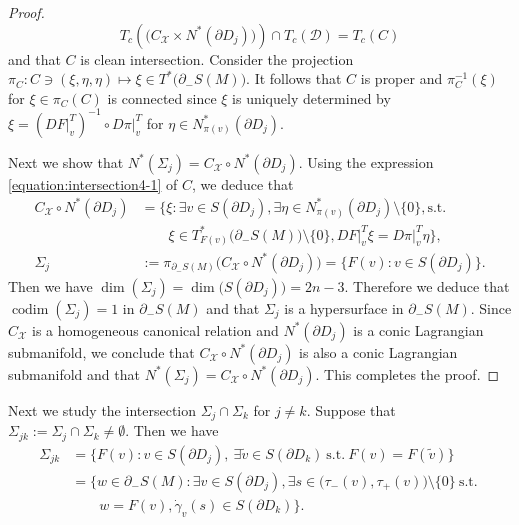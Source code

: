 \documentclass[a4paper,11pt,reqno]{amsart}
\numberwithin{equation}{section}
\theoremstyle{definition}
\theoremstyle{remark}
\begin{document}
\begin{proof}
%
%
$$
T_c(\bigl(C_\mathcal{X}{\times}N^\ast(\partial{D_j})\bigr)){\cap}T_c(\mathcal{D})=T_c(C)
$$
%
% 
and that $C$ is clean intersection. 
Consider the projection 
$\pi_C:C\ni(\xi,\eta,\eta) \mapsto \xi \in T^\ast\bigl(\partial_-S(M)\bigr)$.  
It follows that $C$ is proper and $\pi_C^{-1}(\xi)$ for $\xi \in \pi_C(C)$ is connected since $\xi$ is uniquely determined by 
$\xi=(DF\vert^T_v)^{-1}{\circ}D\pi\vert^T_v$ for 
$\eta \in N^\ast_{\pi(v)}(\partial{D_j})$.    
%
%
\par
%
%
Next we show that $N^\ast(\Sigma_j)=C_\mathcal{X}{\circ}N^\ast(\partial{D_j})$. 
Using the expression \eqref{equation:intersection4-1} of $C$, we deduce that 
%
%
\begin{align}
  C_\mathcal{X}{\circ}N^\ast(\partial{D_j})
& =
  \bigl\{
  \xi: 
  \exists v \in S({\partial}D_j), \exists \eta \in N^\ast_{\pi(v)}(\partial{D_j})\setminus\{0\}, \text{s.t.}\
\nonumber
\\
& \qquad   
  \xi \in T^\ast_{F(v)}\bigl(\partial_-S(M)\bigr)\setminus\{0\},
  DF\vert^T_v\xi=D\pi\vert^T_v\eta\bigr\},
\label{equation:nstarsigmaj}
\\
  \Sigma_j
& :=
  \pi_{\partial_-S(M)}\bigl(C_\mathcal{X}{\circ}N^\ast(\partial{D_j})\bigr)
  =
  \{F(v) : v \in S(\partial{D_j})\}.
\nonumber 
\end{align}
%
%
Then we have $\operatorname{dim}(\Sigma_j)=\operatorname{dim}\bigl(S(\partial{D_j})\bigr)=2n-3$. 
Therefore we deduce that 
$\operatorname{codim}(\Sigma_j)=1$ in $\partial_-S(M)$ 
and that $\Sigma_j$ is a hypersurface in $\partial_-S(M)$. 
Since $C_\mathcal{X}$ is a homogeneous canonical relation and 
$N^\ast(\partial{D_j})$ is a conic Lagrangian submanifold, 
we conclude that $C_\mathcal{X}{\circ}N^\ast(\partial{D_j})$ is also a conic Lagrangian submanifold 
and that $N^\ast(\Sigma_j)=C_\mathcal{X}{\circ}N^\ast(\partial{D_j})$. 
This completes the proof. 
\end{proof}
%
%
Next we study the intersection 
$\Sigma_{j}\cap\Sigma_k$ for $j{\ne}k$. 
Suppose that $\Sigma_{jk}:=\Sigma_{j}\cap\Sigma_k\ne\emptyset$. Then we have 
%
%
\begin{align*}
  \Sigma_{jk}
& =
  \{
  F(v)
  : 
  v \in S(\partial{D_j}),\ 
  \exists \tilde{v} \in S(\partial{D_k})\ \text{s.t.}\ F(v)=F(\tilde{v})
  \}
\\
& =
  \bigl\{
  w \in \partial_-S(M)
  :
  \exists v \in S(\partial{D_j}), 
  \exists s \in \bigl(\tau_-(v),\tau_+(v)\bigr)\setminus\{0\}
  \ \text{s.t.}\ 
\\
& \qquad
  w=F(v), 
  \dot{\gamma}_v(s) \in S(\partial{D_k})
  \bigr\}.  
\end{align*}
\end{document}
